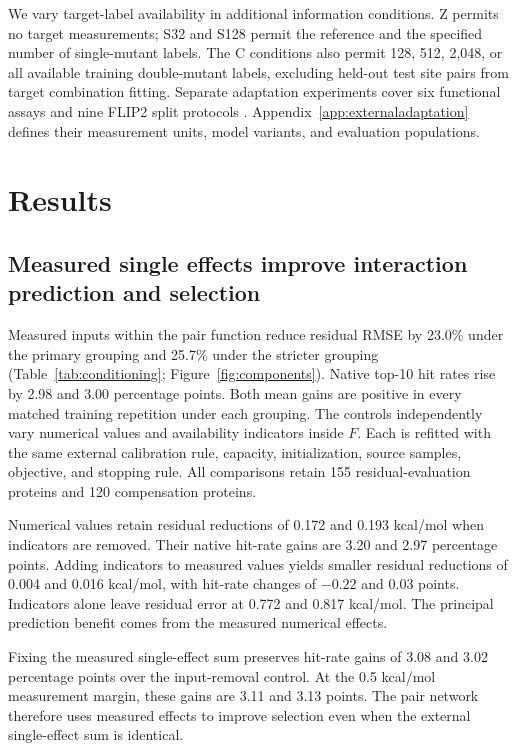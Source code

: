 \documentclass{llncs}
\begin{document}
We vary target-label availability in additional information conditions. Z permits no target measurements; S32 and S128 permit the reference and the specified number of single-mutant labels. The C conditions also permit 128, 512, 2,048, or all available training double-mutant labels, excluding held-out test site pairs from target combination fitting. Separate adaptation experiments cover six functional assays and nine FLIP2 split protocols \citep{didi2026}. Appendix~\ref{app:externaladaptation} defines their measurement units, model variants, and evaluation populations.

\section{Results}

\subsection{Measured single effects improve interaction prediction and selection}

Measured inputs within the pair function reduce residual RMSE by 23.0\% under the primary grouping and 25.7\% under the stricter grouping (Table~\ref{tab:conditioning}; Figure~\ref{fig:components}). Native top-10 hit rates rise by 2.98 and 3.00 percentage points. Both mean gains are positive in every matched training repetition under each grouping. The controls independently vary numerical values and availability indicators inside $F$. Each is refitted with the same external calibration rule, capacity, initialization, source samples, objective, and stopping rule. All comparisons retain 155 residual-evaluation proteins and 120 compensation proteins.

Numerical values retain residual reductions of 0.172 and 0.193 kcal/mol when indicators are removed. Their native hit-rate gains are 3.20 and 2.97 percentage points. Adding indicators to measured values yields smaller residual reductions of 0.004 and 0.016 kcal/mol, with hit-rate changes of $-0.22$ and 0.03 points. Indicators alone leave residual error at 0.772 and 0.817 kcal/mol. The principal prediction benefit comes from the measured numerical effects.

Fixing the measured single-effect sum preserves hit-rate gains of 3.08 and 3.02 percentage points over the input-removal control. At the 0.5 kcal/mol measurement margin, these gains are 3.11 and 3.13 points. The pair network therefore uses measured effects to improve selection even when the external single-effect sum is identical.
\end{document}
